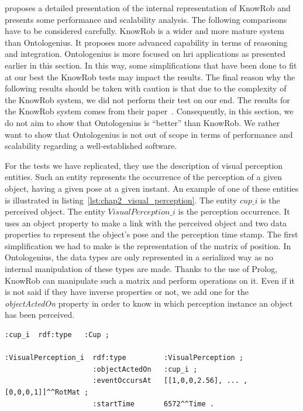 \cite{tenorth_2017_representations} proposes a detailed presentation of the internal representation of KnowRob and presents some performance and scalability analysis. The following comparisons have to be considered carefully. KnowRob is a wider and more mature system than Ontologenius. It proposes more advanced capability in terms of reasoning and integration. Ontologenius is more focused on \acrshort{hri} applications as presented earlier in this section. In this way, some simplifications that have been done to fit at our best the KnowRob tests may impact the results. The final reason why the following results should be taken with caution is that due to the complexity of the KnowRob system, we did not perform their test on our end. The results for the KnowRob system comes from their paper~\cite{tenorth_2017_representations}. Consequently, in this section, we do not aim to show that Ontologenius is ``better'' than KnowRob. We rather want to show that Ontologenius is not out of scope in terms of performance and scalability regarding a well-established software.

For the tests we have replicated, they use the description of visual perception entities. Such an entity represents the occurrence of the perception of a given object, having a given pose at a given instant. An example of one of these entities is illustrated in listing~\ref{lst:chap2_visual_perception}. The entity $cup\_i$ is the perceived object. The entity $VisualPerception\_i$ is the perception occurrence. It uses an object property to make a link with the perceived object and two data properties to represent the object's pose and the perception time stamp. The first simplification we had to make is the representation of the matrix of position. In Ontologenius, the data types are only represented in a serialized way as no internal manipulation of these types are made. Thanks to the use of Prolog, KnowRob can manipulate such a matrix and perform operations on it. Even if it is not said if they have inverse properties or not, we add one for the \textit{objectActedOn} property in order to know in which perception instance an object has been perceived.

\begin{lstlisting}[frame=single, basicstyle=\scriptsize\ttfamily, label={lst:chap2_visual_perception}, caption={Description of a visual perception entity created in a comparable way as in the KnowRob system. The description is provided in the OWL language using the Turtle syntax.},captionpos=b, style=OwlTurtle_indiv]
:cup_i  rdf:type   :Cup ;

:VisualPerception_i  rdf:type         :VisualPerception ;
                     :objectActedOn   :cup_i ;
                     :eventOccursAt   [[1,0,0,2.56], ... ,[0,0,0,1]]^^RotMat ;
                     :startTime       6572^^Time .
\end{lstlisting}

